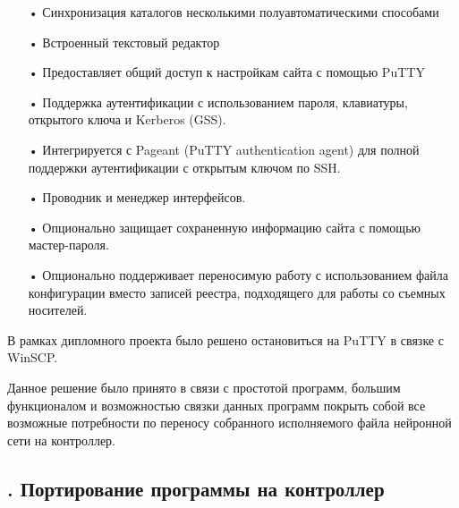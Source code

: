 {\begin{itemize}[leftmargin=2.15cm, labelwidth=0.65cm, labelsep=0.0cm]
		\item[•] Синхронизация каталогов несколькими полуавтоматическими способами 
		\addtocounter{itemcntr}{1}

		\item[•] Встроенный текстовый редактор
		\addtocounter{itemcntr}{1}

		\item[•] Предоставляет общий доступ к настройкам сайта с помощью PuTTY 
		\addtocounter{itemcntr}{1}

		\item[•] Поддержка аутентификации с использованием пароля, клавиатуры, открытого ключа и Kerberos (GSS). 
		\addtocounter{itemcntr}{1}

		\item[•] Интегрируется с Pageant (PuTTY authentication agent) для полной поддержки аутентификации с открытым ключом по SSH.
		\addtocounter{itemcntr}{1}

		\item[•] Проводник и менеджер интерфейсов. 
		\addtocounter{itemcntr}{1}

		\item[•] Опционально защищает сохраненную информацию сайта с помощью мастер-пароля.
		\addtocounter{itemcntr}{1}

		\item[•] Опционально поддерживает переносимую работу с использованием файла конфигурации вместо записей реестра, подходящего для работы со съемных носителей.
		\addtocounter{itemcntr}{1}

	\end{itemize} \setcounter{itemcntr}{1}	

	\par \redline В рамках дипломного проекта было решено остановиться на PuTTY в связке с WinSCP. 

    \par \redline Данное решение было принято в связи с простотой программ, большим функционалом и возможностью связки данных программ покрыть собой все возможные потребности по переносу собранного исполняемого файла нейронной сети на контроллер.

	\par
}

\subtitlespace

\subsection*{
	\gostTitleFont
	\redline
	\thechaptercntr .\thesubchaptercntr \spc
	Портирование программы на контроллер
} \addtocounter{subchaptercntr}{1}

